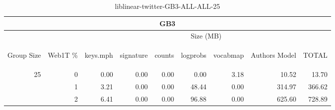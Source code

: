 \begin{center}
\begin{table}[htbp]
\begin{tabular}{ | r | r | r | r | r | r | r | r | r |}
\hline
\multicolumn{9}{|c|}{GB3}\\
\hline
 & & \multicolumn{7}{|c|}{Size (MB)}\\ \cline{3-9}
\begin{sideways}Group Size\end{sideways} & \begin{sideways}Web1T \% \end{sideways} & \begin{sideways}keys.mph\end{sideways} & \begin{sideways}signature\end{sideways} & \begin{sideways}counts\end{sideways} & \begin{sideways}logprobs\end{sideways} & \begin{sideways}vocabmap\end{sideways} & \begin{sideways}Authors Model \end{sideways} & \begin{sideways}TOTAL\end{sideways}\\
\hline
\multirow{2}{*}{25}
 & 0 & 0.00 & 0.00 & 0.00 & 0.00 & 3.18 & 10.52 & 13.70\\ \cline{2-9}
 & 1 & 3.21 & 0.00 & 0.00 & 48.44 & 0.00 & 314.97 & 366.62\\ \cline{2-9}
 & 2 & 6.41 & 0.00 & 0.00 & 96.88 & 0.00 & 625.60 & 728.89\\ \cline{2-9}
\hline
\end{tabular}
\caption{liblinear-twitter-GB3-ALL-ALL-25}
\label{table:liblinear-twitter-GB3-ALL-ALL-25}
\end{table}
\end{center}

